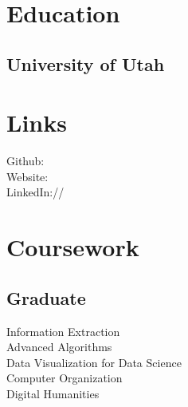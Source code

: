 \documentclass[]{deedy-resume-openfont}
\begin{document}
%
%
\lastupdated

%
%

%
%

\begin{minipage}[t]{0.33\textwidth} 


\section{Education}

\subsection{University of Utah}
\sectionsep


\section{Links} 
Github: \href{https://github.com/cincospenguinos}{} \\
Website: \href{https://andrelafleur.io}{} \\
LinkedIn://  \href{https://www.linkedin.com/in/andre-lafleur-a4107a102/}{} \\
\sectionsep


\section{Coursework}
\subsection{Graduate}
Information Extraction \\
Advanced Algorithms \\
Data Visualization for Data Science \\
Computer Organization \\
Digital Humanities \\
\sectionsep


\end{minipage}
\end{document}
